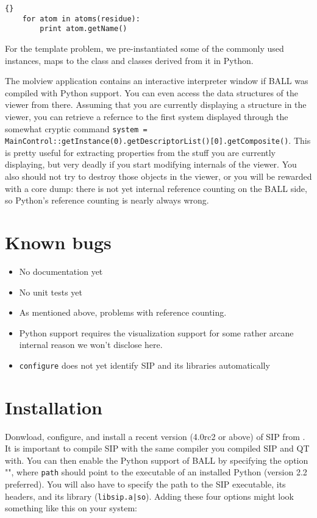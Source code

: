 \begin{lstlisting}{}
	for atom in atoms(residue):
		print atom.getName()
\end{lstlisting}

\noindent For the template problem, we pre-instantiated some of the 
commonly used instances, \eg {} maps to the 
 class and classes derived from it in Python.

The molview application contains an interactive interpreter window
if BALL was compiled with Python support. You can even access the
data structures of the viewer from there. Assuming that you are
currently displaying a structure in the viewer, you can retrieve a
refernce to the first system displayed through the somewhat cryptic
command {\tt system =
MainControl::getInstance(0).getDescriptorList()[0].getComposite()}.
This is pretty useful for extracting properties from the stuff you are
currently displaying, but very deadly if you start modifying internals
of the viewer. You also should not try to destroy those objects in the
viewer, or you will be rewarded with a core dump: there is not yet
internal reference counting on the BALL side, so Python's reference
counting is nearly always wrong.
		

\section{Known bugs}
\begin{itemize}
	\item No documentation yet
	\item No unit tests yet
	\item As mentioned above, problems with reference counting.
	\item Python support requires the visualization support for some rather
				arcane internal reason we won't disclose here.
	\item {\tt configure} does not yet identify SIP and its libraries
				automatically
\end{itemize}

\section{Installation}

Donwload, configure, and install a recent version (4.0rc2 or above) of SIP from 
. It is important to compile SIP 
with the same \CPP compiler you compiled SIP and QT with. You can then enable the Python support of BALL
by specifying the option \mbox{""}, where
{\tt path} should point to the executable of an installed Python (version 2.2
preferred). You will also have to specify the path to the SIP executable, its
headers, and its library ({\tt libsip.a|so}). Adding these four options might
look something like this on your system:

